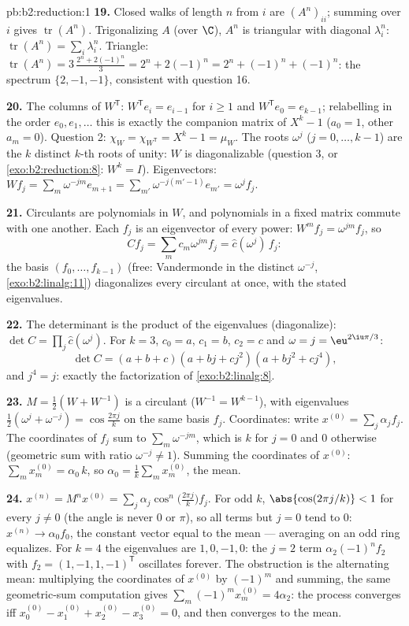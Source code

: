 \begin{solution}{pb:b2:reduction:1}
\textbf{19.} Closed walks of length $n$ from $i$ are
$(A^n)_{ii}$; summing over $i$ gives $\operatorname{tr}(A^n)$.
Trigonalizing $A$ (over $\C$), $A^n$ is triangular with diagonal
$\lambda_i^n$: $\operatorname{tr}(A^n) = \sum_i\lambda_i^n$.
Triangle: $\operatorname{tr}(A^n) = 3\,\frac{2^n + 2(-1)^n}3 =
2^n + 2(-1)^n = 2^n + (-1)^n + (-1)^n$: the spectrum $\{2, -1,
-1\}$, consistent with question 16.

\textbf{20.} The columns of $W^{\mathsf T}$: $W^{\mathsf T}e_i =
e_{i-1}$ for $i \geq 1$ and $W^{\mathsf T}e_0 = e_{k-1}$;
relabelling in the order $e_0, e_1, \dots$ this is exactly the
companion matrix of $X^k - 1$ ($a_0 = 1$, other $a_m = 0$).
Question 2: $\chi_{W} = \chi_{W^{\mathsf T}} = X^k - 1 =
\mu_{W}$. The roots $\omega^j$ ($j = 0, \dots, k-1$) are the $k$
distinct $k$-th roots of unity: $W$ is diagonalizable (question
3, or \cref{exo:b2:reduction:8}: $W^k = I$). Eigenvectors: $Wf_j
= \sum_m \omega^{-jm}e_{m+1} = \sum_{m'}\omega^{-j(m'-1)}e_{m'}
= \omega^j f_j$.

\textbf{21.} Circulants are polynomials in $W$, and polynomials
in a fixed matrix commute with one another. Each $f_j$ is an
eigenvector of every power: $W^m f_j = \omega^{jm}f_j$, so
\[
Cf_j = \sum_m c_m\omega^{jm} f_j = \widehat c(\omega^j)\,f_j :
\]
the basis $(f_0, \dots, f_{k-1})$ (free: Vandermonde in the
distinct $\omega^{-j}$, \cref{exo:b2:linalg:11}) diagonalizes
every circulant at once, with the stated eigenvalues.

\textbf{22.} The determinant is the product of the eigenvalues
(diagonalize): $\det C = \prod_{j}\widehat c(\omega^j)$. For $k
= 3$, $c_0 = a$, $c_1 = b$, $c_2 = c$ and $\omega = j =
\eu^{2\iu\pi/3}$:
\[
\det C = (a + b + c)(a + bj + cj^2)(a + bj^2 + cj^4),
\]
and $j^4 = j$: exactly the factorization of
\cref{exo:b2:linalg:8}.

\textbf{23.} $M = \frac12(W + W^{-1})$ is a circulant ($W^{-1} =
W^{k-1}$), with eigenvalues $\frac12(\omega^j + \omega^{-j}) =
\cos\frac{2\pi j}k$ on the same basis $f_j$. Coordinates: write
$x^{(0)} = \sum_j \alpha_j f_j$. The coordinates of $f_j$ sum to
$\sum_m \omega^{-jm}$, which is $k$ for $j = 0$ and $0$
otherwise (geometric sum with ratio $\omega^{-j} \neq 1$).
Summing the coordinates of $x^{(0)}$: $\sum_m x^{(0)}_m =
\alpha_0\,k$, so $\alpha_0 = \frac1k\sum_m x^{(0)}_m$, the mean.

\textbf{24.} $x^{(n)} = M^nx^{(0)} = \sum_j
\alpha_j\cos^n\bigl(\tfrac{2\pi j}k\bigr)f_j$. For odd $k$,
$\abs{\cos(2\pi j/k)} < 1$ for every $j \neq 0$ (the angle is
never $0$ or $\pi$), so all terms but $j = 0$ tend to $0$:
$x^{(n)} \to \alpha_0 f_0$, the constant vector equal to the
mean --- averaging on an odd ring equalizes. For $k = 4$ the
eigenvalues are $1, 0, -1, 0$: the $j = 2$ term
$\alpha_2(-1)^nf_2$ with $f_2 = (1, -1, 1, -1)^{\mathsf T}$
oscillates forever. The obstruction is the alternating mean:
multiplying the coordinates of $x^{(0)}$ by $(-1)^m$ and
summing, the same geometric-sum computation gives $\sum_m
(-1)^mx^{(0)}_m = 4\alpha_2$: the process converges iff
$x^{(0)}_0 - x^{(0)}_1 + x^{(0)}_2 - x^{(0)}_3 = 0$, and then
converges to the mean.


\end{solution}
